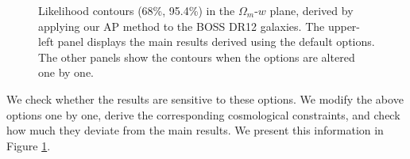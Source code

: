 \documentclass[iop]{emulateapj}
\begin{document}
\begin{figure}
   \caption{ \label{fig_contour_RB}  
   Likelihood contours (68\%, 95.4\%) in the $\Omega_m$-$w$ plane, derived by applying our AP method to the BOSS DR12 galaxies.
   The upper-left panel displays the main results derived using the default options.
   The other panels show the contours when the options are altered one by one.
   }
\end{figure}

We check whether the results are sensitive to these options.
We modify the above options one by one, 
derive the corresponding cosmological constraints, 
and check how much they deviate from the main results.
We present this information in Figure \ref{fig_contour_RB}. %
\end{document}
